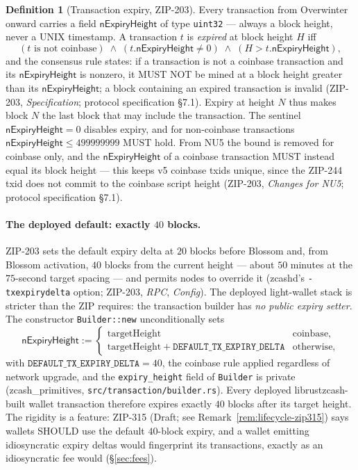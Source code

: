 \documentclass[11pt,a4paper]{article}
\theoremstyle{definition}
\newtheorem{definition}[theorem]{Definition}
\begin{document}
\begin{definition}[Transaction expiry, ZIP-203]\label{def:lifecycle-expiry}
Every transaction from Overwinter onward carries a field
$\mathsf{nExpiryHeight}$ of type \texttt{uint32} --- always a block height,
never a UNIX timestamp. A transaction $t$ is \emph{expired} at block height
$H$ iff
\[
(t \text{ is not coinbase}) \;\wedge\;
(t.\mathsf{nExpiryHeight} \neq 0) \;\wedge\;
(H > t.\mathsf{nExpiryHeight}),
\]
and the consensus rule states: if a transaction is not a coinbase
transaction and its $\mathsf{nExpiryHeight}$ is nonzero, it MUST NOT be
mined at a block height greater than its $\mathsf{nExpiryHeight}$; a block
containing an expired transaction is invalid (ZIP-203, \emph{Specification};
protocol specification \S7.1). Expiry at height $N$ thus makes block $N$
the last block that may include the transaction. The sentinel
$\mathsf{nExpiryHeight} = 0$ disables expiry, and for non-coinbase
transactions $\mathsf{nExpiryHeight} \le 499999999$ MUST hold. From NU5
the bound is removed for coinbase only, and the $\mathsf{nExpiryHeight}$ of
a coinbase transaction MUST instead equal its block height --- this keeps v5
coinbase txids unique, since the ZIP-244 txid does not commit to the
coinbase script height (ZIP-203, \emph{Changes for NU5}; protocol
specification \S7.1).
\end{definition}

\paragraph{The deployed default: exactly $40$ blocks.} ZIP-203 sets the
default expiry delta at $20$ blocks before Blossom and, from Blossom
activation, $40$ blocks from the current height --- about $50$ minutes at
the $75$-second target spacing --- and permits nodes to override it
(\textsf{zcashd}'s \texttt{-txexpirydelta} option; ZIP-203, \emph{RPC},
\emph{Config}). The deployed light-wallet stack is stricter than the ZIP
requires: the transaction builder has \emph{no public expiry setter}. The
constructor \texttt{Builder::new} unconditionally sets
\[
\mathsf{nExpiryHeight} :=
\begin{cases}
  \mathrm{targetHeight} & \text{coinbase},\\
  \mathrm{targetHeight} + \mathtt{DEFAULT\_TX\_EXPIRY\_DELTA} &
    \text{otherwise},
\end{cases}
\]
with $\mathtt{DEFAULT\_TX\_EXPIRY\_DELTA} = 40$,
the coinbase rule applied regardless of network upgrade, and the
\texttt{expiry\_height} field of \texttt{Builder} is private
(\textsf{zcash\_primitives}, \texttt{src/transaction/builder.rs}). Every
deployed librustzcash-built wallet transaction therefore expires exactly
$40$ blocks after its target height. The rigidity is a feature: ZIP-315
(Draft; see Remark~\ref{rem:lifecycle-zip315}) says wallets SHOULD use the
default $40$-block expiry, and a wallet emitting idiosyncratic expiry
deltas would fingerprint its transactions, exactly as an idiosyncratic fee
would (\S\ref{sec:fees}).
\end{document}
